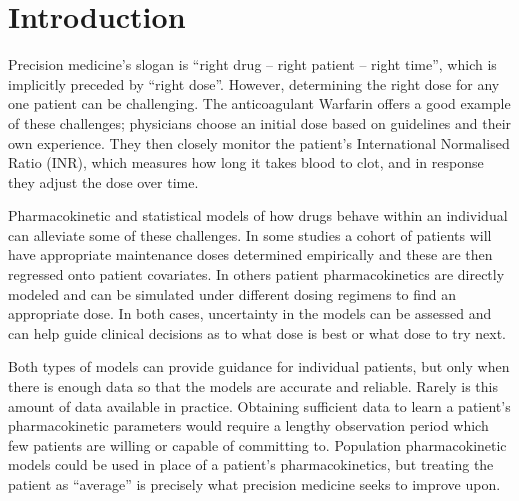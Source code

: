 \section{Introduction}

Precision medicine’s slogan is ``right drug -- right patient -- right time'', which is implicitly preceded by ``right dose''. However, determining the right dose for any one patient can be challenging. The anticoagulant Warfarin offers a good example of these challenges; physicians choose an initial dose based on guidelines and their own experience. They then closely monitor the patient’s International Normalised Ratio (INR), which measures how long it takes blood to clot, and in response they adjust the dose over time.

Pharmacokinetic and statistical models of how drugs behave within an individual can alleviate some of these challenges.  In some studies \cite{Sohrabi2017-zv, Caldwell2007-mi, international2009estimation}  a cohort of patients will have appropriate maintenance doses determined empirically and these are then regressed onto patient covariates.  In others \cite{Zhu2017-rk, Xue2017-mp}  patient pharmacokinetics are directly modeled and can be simulated under different dosing regimens to find an appropriate dose.  In both cases, uncertainty in the models can be assessed and can help guide clinical decisions as to what dose is best or what dose to try next.

Both types of  models can provide guidance for individual patients, but only when there is enough data so that the models are accurate and reliable.  Rarely is this amount of data available in practice.  Obtaining sufficient data to learn a patient’s pharmacokinetic parameters would require a lengthy observation period which few patients are willing or capable of committing to. Population pharmacokinetic models could be used in place of a patient’s pharmacokinetics, but treating the patient as “average” is precisely what precision medicine seeks to improve upon.

